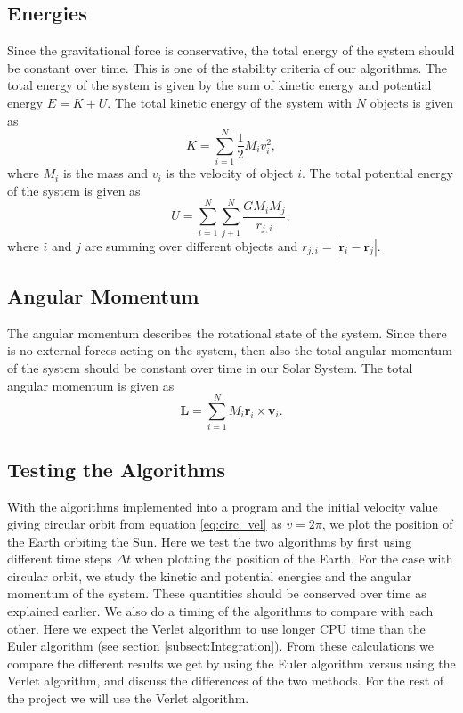 \documentclass[12pt,a4paper,english]{article}
\begin{document}
\subsection{Energies}
\label{subsect:Energies}
Since the gravitational force is conservative, the total energy of the system should be constant over time. This is one of the stability criteria of our algorithms. The total energy of the system is given by the sum of kinetic energy and potential energy $E=K+U$. The total kinetic energy of the system with $N$ objects is given as
\begin{equation}
\label{eq:K}
K=\sum_{i=1}^{N}\frac{1}{2}M_iv_i^2,
\end{equation}
where $M_i$ is the mass and $v_i$ is the velocity of object $i$. The total potential energy of the system is given as 
\begin{equation}
\label{eq:U}
U=\sum_{i=1}^{N}\sum_{j+1}^{N}\frac{GM_iM_j}{r_{j,i}},
\end{equation}
where $i$ and $j$ are summing over different objects and $r_{j,i}=|\textbf{r}_i-\textbf{r}_j|$.

\subsection{Angular Momentum}
\label{subsect:Ang_mom}
The angular momentum describes the rotational state of the system. Since there is no external forces acting on the system, then also the total angular momentum of the system should be constant over time in our Solar System. The total angular momentum is given as
\begin{equation}
\label{eq:ang_mom}
\textbf{L}=\sum_{i=1}^{N}M_i\textbf{r}_i\times \textbf{v}_i.
\end{equation}

\subsection{Testing the Algorithms}
\label{subsect:Testing}
With the algorithms implemented into a program and the initial velocity value giving circular orbit from equation \ref{eq:circ_vel} as $v=2\pi$, we plot the position of the Earth orbiting the Sun. Here we test the two algorithms by first using different time steps $\Delta t$ when plotting the position of the Earth. For the case with circular orbit, we study the kinetic and potential energies and the angular momentum of the system. These quantities should be conserved over time as explained earlier. We also do a timing of the algorithms to compare with each other. Here we expect the Verlet algorithm to use longer CPU time than the Euler algorithm (see section \ref{subsect:Integration}). From these calculations we compare the different results we get by using the Euler algorithm versus using the Verlet algorithm, and discuss the differences of the two methods. For the rest of the project we will use the Verlet algorithm.
\end{document}
